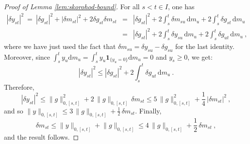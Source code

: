 \documentclass[11pt,reqno,oneside]{amsart}
\numberwithin{equation}{section}
\newcommand{\mathd}{\mathrm{d}}
\begin{document}
\begin{proof}[Proof of Lemma \ref{lem:skorohod-bound}]
For all $s< t \in I$, one has
\begin{eqnarray*}
|\delta y_{st}|^2 \ =\ |\delta g_{st}|^2+|\delta m_{st}|^2+2 \delta g_{st} \delta m_{st}&= & |\delta g_{st}|^2+2\int_s^t \delta m_{su} \, \mathd m_u+2\int_s^t \delta g_{st} \, \mathd m_u \\
&= & |\delta g_{st}|^2+2\int_s^t \delta y_{su} \, \mathd m_u+2\int_s^t \delta g_{ut} \, \mathd m_u\ ,
\end{eqnarray*}
where we have just used the fact that $\delta m_{su} = \delta y_{su} - \delta g_{su}$ for the last identity. Moreover, since $\int_s^t y_u \mathd m_u=\int_s^t y_u \mathbf{1}_{\{y_u=0\}} \mathd m_u=0$ and $y_s \geqslant 0$, we get:
\begin{equation*}
|\delta y_{st}|^2
\leqslant  |\delta g_{st}|^2+2\int_s^t \delta g_{ut} \, \mathd m_u \ .
\end{equation*}
Therefore,
$$|\delta y_{st}|^2 \leqslant \lVert g\rVert^2_{0,[s,t]}+2 \, \lVert g\rVert_{0,[s,t]}\, \delta m_{st}\leqslant 5\, \lVert g\rVert^2_{0,[s,t]}+\frac14\, |\delta m_{st}|^2 \ ,$$
and so $\lVert y\rVert_{0,[s,t]} \leqslant 3\, \lVert g\rVert_{0,[s,t]}+\frac12 \, \delta m_{st}$. Finally,
$$\delta m_{st}\leqslant \lVert y\rVert_{0,[s,t]}+\lVert g\rVert_{0,[s,t]} \leqslant 4 \, \lVert g\rVert_{0,[s,t]} +\frac12\, \delta m_{st} \ , $$
and the result follows.
\end{proof}
\end{document}
